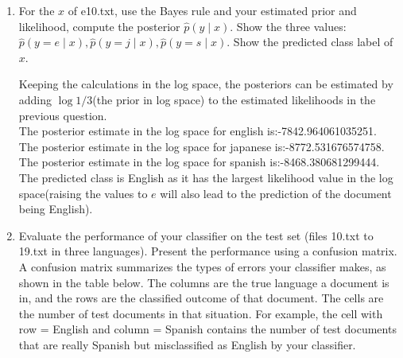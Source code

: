 \documentclass[a4paper]{article}
\theoremstyle{definition}
\newenvironment{soln}{
    \leavevmode\color{blue}\ignorespaces
}{}
\begin{document}
\begin{enumerate}
\begin{soln}
\end{soln}
\item
For the $x$ of e10.txt, use the Bayes rule and your estimated prior and likelihood, compute the posterior $\hat p(y \mid x)$.
Show the three values: $\hat p(y=e \mid x), \hat p(y=j \mid x), \hat p(y=s \mid x)$.
Show the predicted class label of $x$.\\
\begin{soln}
    Keeping the calculations in the log space, the posteriors can be estimated by adding $\log 1/3$(the prior in log space) to the estimated likelihoods in the previous question. \\
    The posterior estimate in the log space for english is:-7842.964061035251.\\
The posterior estimate in the log space for japanese is:-8772.531676574758.\\
The posterior estimate in the log space for spanish is:-8468.380681299444.
The predicted class is English as it has the largest likelihood value in the log space(raising the values to $e$ will also lead to the prediction of the document being English).
\end{soln}
\item
Evaluate the performance of your classifier on the test set (files 10.txt to 19.txt in three languages).
Present the performance using a confusion matrix. A confusion matrix summarizes the types of errors your classifier makes, as shown in the table below.   The columns are the true language a document is in, and the rows are the classified outcome of that document.  The cells are the number of test documents in that situation.  For example, the cell with row = English and column = Spanish contains the number of test documents that are really Spanish but misclassified as English by your classifier.



\end{enumerate}
\end{document}
